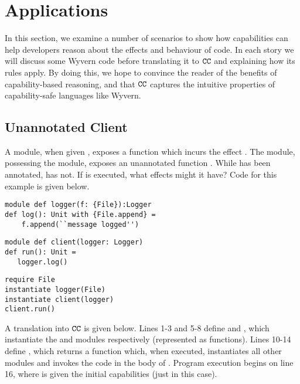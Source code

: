 \section{Applications}
\label{s:app}

In this section, we examine a number of scenarios to show how capabilities can help
developers reason about the effects and behaviour of code. In each story we will
discuss some Wyvern code before translating it to $\mathtt{CC}$ and explaining how its
rules apply. By doing this, we hope to convince the reader of the benefits of
capability-based reasoning, and that $\mathtt{CC}$ captures the intuitive properties of
capability-safe languages like Wyvern.

\subsection{Unannotated Client}
\label{s:unann-client}

A  module, when given , exposes a  function
which incurs the effect . The  module, possessing the
 module, exposes an unannotated function . While
 has been annotated,  has not. If  is
executed, what effects might it have? Code for this example is given below. 

\begin{lstlisting}
module def logger(f: {File}):Logger
def log(): Unit with {File.append} =
    f.append(``message logged'')
\end{lstlisting}

\begin{lstlisting}
module def client(logger: Logger)
def run(): Unit =
   logger.log()
\end{lstlisting}

\begin{lstlisting}
require File
instantiate logger(File)
instantiate client(logger)
client.run()
\end{lstlisting}

A translation into $\mathtt{CC}$ is given below. Lines 1-3 and 5-8 define
 and , which instantiate the  and
 modules respectively (represented as functions). Lines 10-14 define
, which returns a function which, when executed, instantiates all
other modules and invokes the code in the body of . Program execution
begins on line 16, where  is given the initial capabilities (just 
in this case).

